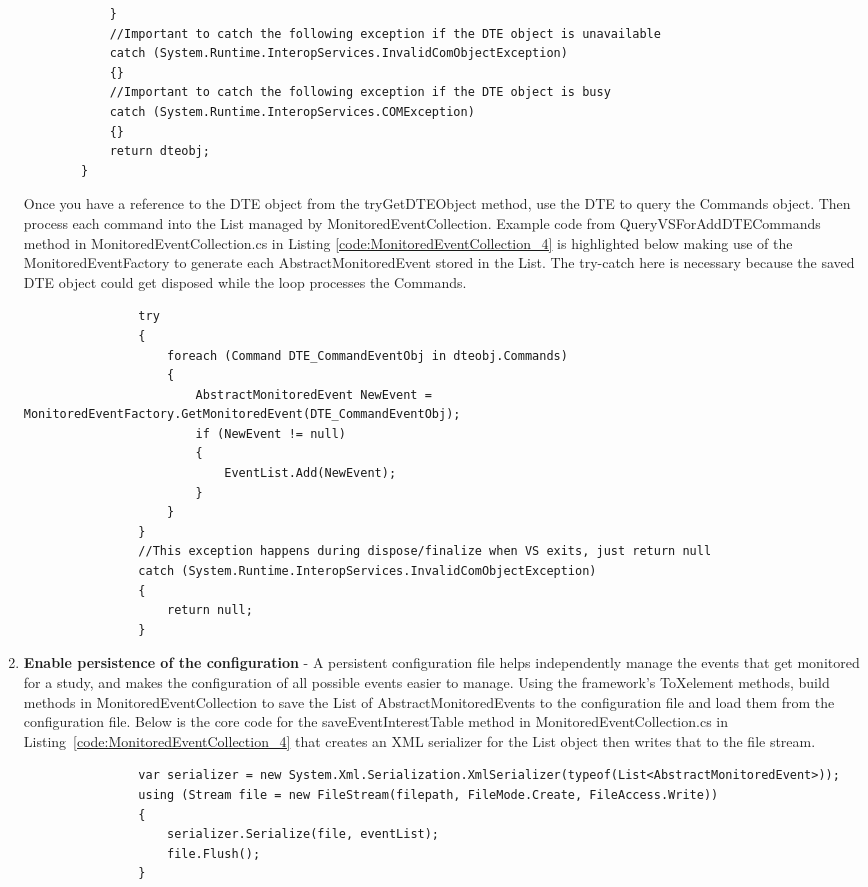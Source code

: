 \begin{enumerate}
\begin{lstlisting}
			}
			//Important to catch the following exception if the DTE object is unavailable
			catch (System.Runtime.InteropServices.InvalidComObjectException)
			{} 
			//Important to catch the following exception if the DTE object is busy
			catch (System.Runtime.InteropServices.COMException)
			{}
			return dteobj;
		}

\end{lstlisting}

Once you have a reference to the DTE object from the tryGetDTEObject method, use the DTE to query the Commands  object.  Then process each command into the List managed by MonitoredEventCollection.  Example code from QueryVSForAddDTECommands method in MonitoredEventCollection.cs in Listing \ref{code:MonitoredEventCollection_4} is highlighted below making use of the MonitoredEventFactory to generate each AbstractMonitoredEvent stored in the List.  The try-catch here is necessary because the saved DTE object could get disposed while the loop processes the Commands.

\begin{lstlisting}
                try
                {
                    foreach (Command DTE_CommandEventObj in dteobj.Commands)
                    {
                        AbstractMonitoredEvent NewEvent = MonitoredEventFactory.GetMonitoredEvent(DTE_CommandEventObj);
                        if (NewEvent != null)
                        {
                            EventList.Add(NewEvent);
                        }
                    }
                }
                //This exception happens during dispose/finalize when VS exits, just return null
                catch (System.Runtime.InteropServices.InvalidComObjectException)
                {
                    return null;
                }
\end{lstlisting}

\item {\bf Enable persistence of the configuration} -
A persistent configuration file helps independently manage the events that get monitored for a study, and makes the configuration of all possible events easier to manage.    Using the framework's ToXelement methods, build methods in MonitoredEventCollection to save the List of AbstractMonitoredEvents to the configuration file and load them from the configuration file.  Below is the core code for the saveEventInterestTable method in MonitoredEventCollection.cs in Listing~\ref{code:MonitoredEventCollection_4} that creates an XML serializer for the List object then writes that to the file stream.  

\begin{lstlisting}
                var serializer = new System.Xml.Serialization.XmlSerializer(typeof(List<AbstractMonitoredEvent>));
                using (Stream file = new FileStream(filepath, FileMode.Create, FileAccess.Write))
                {
                    serializer.Serialize(file, eventList);
                    file.Flush();
                }
\end{lstlisting}

\end{enumerate}


